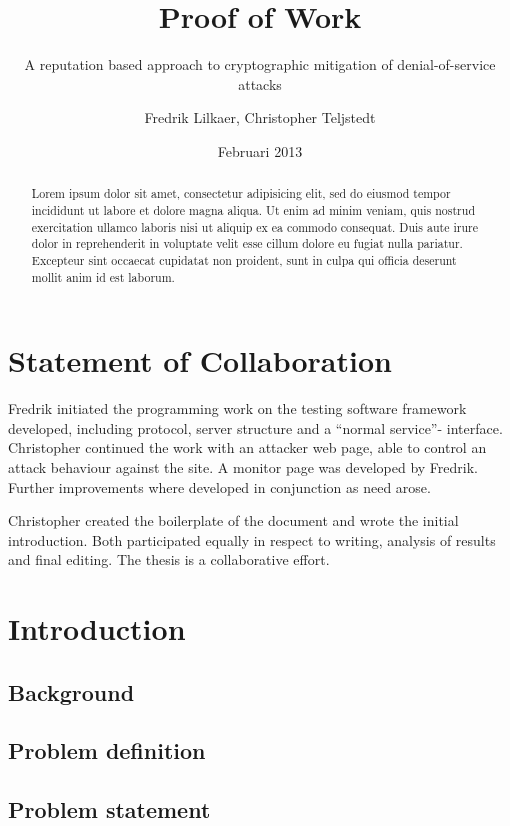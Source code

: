 \documentclass[a4paper,11pt]{kth-mag}
\title{Proof of Work}
\subtitle{A reputation based approach to cryptographic mitigation of denial-of-service attacks}
\author{Fredrik Lilkaer, Christopher Teljstedt}
\date{Februari 2013}
\begin{document}
\removepagenumbers
\maketitle
{}
\newpage
\begin{abstract}
Lorem ipsum dolor sit amet, consectetur adipisicing elit, sed do eiusmod tempor incididunt ut labore et dolore magna aliqua. Ut enim ad minim veniam, quis nostrud exercitation ullamco laboris nisi ut aliquip ex ea commodo consequat. Duis aute irure dolor in reprehenderit in voluptate velit esse cillum dolore eu fugiat nulla pariatur. Excepteur sint occaecat cupidatat non proident, sunt in culpa qui officia deserunt mollit anim id est laborum.
\end{abstract}
\newpage
\section*{Statement of Collaboration}
Fredrik initiated the programming work on the testing software framework developed, including protocol, server structure and a ``normal service''- interface. Christopher continued the work with an attacker web page, able to control an attack behaviour against the site. A monitor page was developed by Fredrik. Further improvements where developed in conjunction as need arose.

Christopher created the boilerplate of the document and wrote the initial introduction. Both participated equally in respect to writing, analysis of results and final editing. The thesis is a collaborative effort.
\newpage 
\setcounter{section}{0}
\tableofcontents
\newpage
\section{Introduction}

\subsection{Background}

\subsection{Problem definition}

\subsection{Problem statement} %

\end{document}
